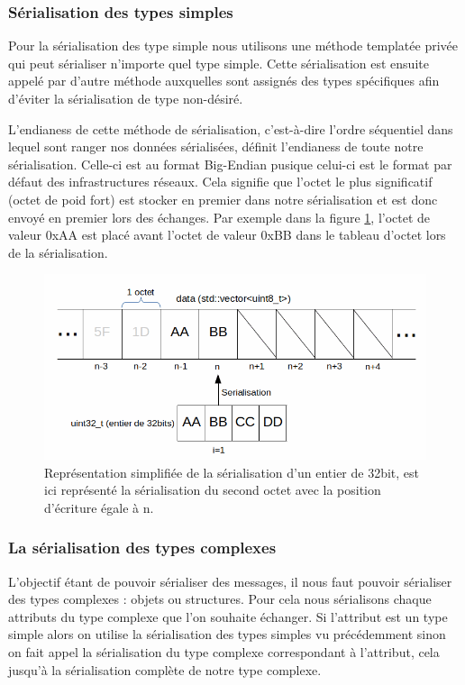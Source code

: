 \documentclass[a4paper, 12pt]{article}
\begin{document}
		\subsubsection{Sérialisation des types simples}

		Pour la sérialisation des type simple nous utilisons une méthode templatée privée qui peut sérialiser n'importe quel type simple. Cette sérialisation est ensuite appelé par d'autre méthode auxquelles sont assignés des types spécifiques afin d'éviter la sérialisation de type non-désiré.
		
		L'endianess de cette méthode de sérialisation, c'est-à-dire l'ordre séquentiel dans lequel sont ranger nos données sérialisées, définit l'endianess de toute notre sérialisation. Celle-ci est au format Big-Endian pusique celui-ci est le format par défaut des infrastructures réseaux. Cela signifie que l'octet le plus significatif (octet de poid fort) est stocker en premier dans notre sérialisation et est donc envoyé en premier lors des échanges. Par exemple dans la figure \ref{fig:serial}, l'octet de valeur 0xAA est placé avant l'octet de valeur 0xBB dans le tableau d'octet lors de la sérialisation.

		\begin{figure}[bt]
			\centering
			\includegraphics[scale=0.35]{img/serialisation.png}
			\caption{Représentation simplifiée de la sérialisation d'un entier de 32bit, est ici représenté la sérialisation du second octet avec la position d'écriture égale à n.}
			\label{fig:serial}
		\end{figure}

		\subsubsection{La sérialisation des types complexes}

		L'objectif étant de pouvoir sérialiser des messages, il nous faut pouvoir sérialiser des types complexes : objets ou structures. Pour cela nous sérialisons chaque attributs du type complexe que l'on souhaite échanger. Si l'attribut est un type simple alors on utilise la sérialisation des types simples vu précédemment sinon on fait appel la sérialisation du type complexe correspondant à l'attribut, cela jusqu'à la sérialisation complète de notre type complexe.
\end{document}
